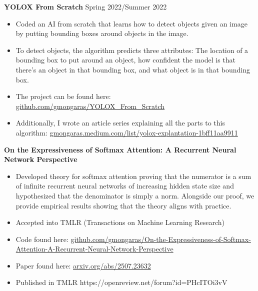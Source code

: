 \documentclass[a4paper,10pt]{article}
\begin{document}
\noindent\textbf{YOLOX From Scratch} \hfill Spring 2022/Summer 2022
\begin{itemize}[noitemsep,topsep=0pt]
  \item Coded an AI from scratch that learns how to detect objects given an image by putting bounding boxes around objects in the image.
  \item To detect objects, the algorithm predicts three attributes: The location of a bounding box to put around an object, how confident the model is that there’s an object in that bounding box, and what object is in that bounding box.
  \item  The project can be found here: \href{https://github.com/gmongaras/YOLOX_From_Scratch}{github.com/gmongaras/YOLOX\_From\_Scratch}
  \item  Additionally, I wrote an article series explaining all the parts to this algorithm:
\href{https://gmongaras.medium.com/list/yolox-explantation-1bff11aa9911}{gmongaras.medium.com/list/yolox-explantation-1bff11aa9911}
\end{itemize}






\vspace{5pt}
 \vspace{1pt}


\noindent\textbf{On the Expressiveness of Softmax Attention: A Recurrent Neural Network Perspective}
\begin{itemize}[noitemsep,topsep=0pt]
  \item Developed theory for softmax attention proving that the numerator is a sum of infinite recurrent neural networks of increasing hidden state size and hypothesized that the denominator is simply a norm. Alongside our proof, we provide empirical results showing that the theory aligns with practice.
  \item Accepted into TMLR (Transactions on Machine Learning Research)
  \item Code found here: \href{https://github.com/gmongaras/On-the-Expressiveness-of-Softmax-Attention-A-Recurrent-Neural-Network-Perspective}{github.com/gmongaras/On-the-Expressiveness-of-Softmax-Attention-A-Recurrent-Neural-Network-Perspective}
  \item Paper found here: \href{https://arxiv.org/abs/2507.23632}{arxiv.org/abs/2507.23632}
  \item Published in TMLR https://openreview.net/forum?id=PHcITOi3vV
\end{itemize}
\end{document}
